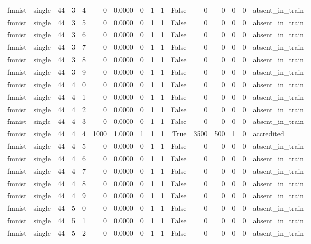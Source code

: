 \begin{tabular}{llrrrrrrrrrrrrrl}
fmnist & single & 44 & 3 & 4 & 0 & 0.0000 & 0 & 1 & 1 & False & 0 & 0 & 0 & 0 & absent\_in\_train \\
fmnist & single & 44 & 3 & 5 & 0 & 0.0000 & 0 & 1 & 1 & False & 0 & 0 & 0 & 0 & absent\_in\_train \\
fmnist & single & 44 & 3 & 6 & 0 & 0.0000 & 0 & 1 & 1 & False & 0 & 0 & 0 & 0 & absent\_in\_train \\
fmnist & single & 44 & 3 & 7 & 0 & 0.0000 & 0 & 1 & 1 & False & 0 & 0 & 0 & 0 & absent\_in\_train \\
fmnist & single & 44 & 3 & 8 & 0 & 0.0000 & 0 & 1 & 1 & False & 0 & 0 & 0 & 0 & absent\_in\_train \\
fmnist & single & 44 & 3 & 9 & 0 & 0.0000 & 0 & 1 & 1 & False & 0 & 0 & 0 & 0 & absent\_in\_train \\
fmnist & single & 44 & 4 & 0 & 0 & 0.0000 & 0 & 1 & 1 & False & 0 & 0 & 0 & 0 & absent\_in\_train \\
fmnist & single & 44 & 4 & 1 & 0 & 0.0000 & 0 & 1 & 1 & False & 0 & 0 & 0 & 0 & absent\_in\_train \\
fmnist & single & 44 & 4 & 2 & 0 & 0.0000 & 0 & 1 & 1 & False & 0 & 0 & 0 & 0 & absent\_in\_train \\
fmnist & single & 44 & 4 & 3 & 0 & 0.0000 & 0 & 1 & 1 & False & 0 & 0 & 0 & 0 & absent\_in\_train \\
fmnist & single & 44 & 4 & 4 & 1000 & 1.0000 & 1 & 1 & 1 & True & 3500 & 500 & 1 & 0 & accredited \\
fmnist & single & 44 & 4 & 5 & 0 & 0.0000 & 0 & 1 & 1 & False & 0 & 0 & 0 & 0 & absent\_in\_train \\
fmnist & single & 44 & 4 & 6 & 0 & 0.0000 & 0 & 1 & 1 & False & 0 & 0 & 0 & 0 & absent\_in\_train \\
fmnist & single & 44 & 4 & 7 & 0 & 0.0000 & 0 & 1 & 1 & False & 0 & 0 & 0 & 0 & absent\_in\_train \\
fmnist & single & 44 & 4 & 8 & 0 & 0.0000 & 0 & 1 & 1 & False & 0 & 0 & 0 & 0 & absent\_in\_train \\
fmnist & single & 44 & 4 & 9 & 0 & 0.0000 & 0 & 1 & 1 & False & 0 & 0 & 0 & 0 & absent\_in\_train \\
fmnist & single & 44 & 5 & 0 & 0 & 0.0000 & 0 & 1 & 1 & False & 0 & 0 & 0 & 0 & absent\_in\_train \\
fmnist & single & 44 & 5 & 1 & 0 & 0.0000 & 0 & 1 & 1 & False & 0 & 0 & 0 & 0 & absent\_in\_train \\
fmnist & single & 44 & 5 & 2 & 0 & 0.0000 & 0 & 1 & 1 & False & 0 & 0 & 0 & 0 & absent\_in\_train \\

\end{tabular}
